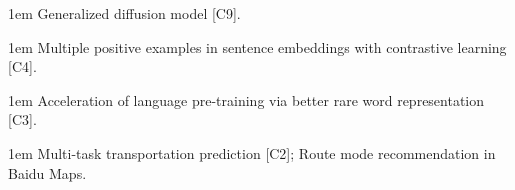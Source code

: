 \documentclass{resume}
\begin{document}
  \hangindent 1em
  \noindent
  Generalized diffusion model [C9].

  \hangindent 1em
  \noindent
  Multiple positive examples in sentence embeddings with contrastive learning \textnormal{[C4]}.

  \hangindent 1em
  \noindent
  Acceleration of language pre-training via better rare word representation \textnormal{[C3]}.
  
  \hangindent 1em
  \noindent
  Multi-task transportation prediction \textnormal{[C2]}; Route mode recommendation in Baidu Maps.
\end{document}
